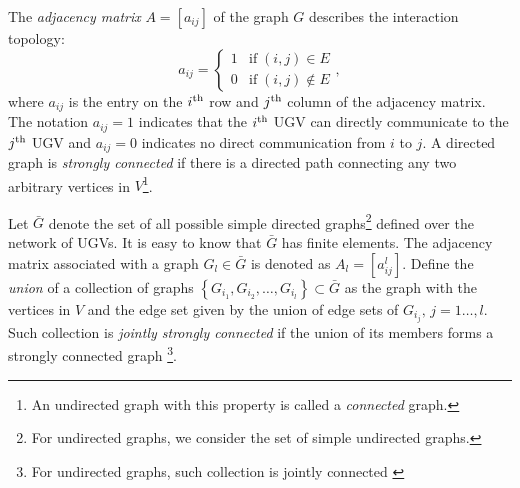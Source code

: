 	The \textit{adjacency matrix} $A=\left[ a_{ij}\right] $ of the graph $G$ describes the interaction topology:
	\small\begin{equation*}
		a_{ij}=\begin{cases}
			1& \text{if}\;\left(i,j\right)\in E\\
			0& \text{if}\;\left(i,j\right)\notin E
		\end{cases},
	\end{equation*} \normalsize
	where $a_{ij}$ is the entry on the $i^\text{th}$ row and $j^\text{th}$ column of the adjacency matrix. 
	The notation $a_{ij}=1$ indicates that the $i^\text{th}$ UGV can directly communicate to the $j^\text{th}$ UGV and $a_{ij}=0$ indicates no direct communication from $i$ to $j$.
	 A directed graph is \textit{strongly connected} if there is a directed path connecting any two arbitrary vertices in $V$\footnote{An undirected graph with this property is called a \textit{connected} graph.}.
	
	Let $\bar{G}$ denote the set of all possible simple directed graphs\footnote{For undirected graphs, we consider the set of simple undirected graphs.} defined over the network of UGVs.
	It is easy to know that $\bar{G}$ has finite elements.
	The adjacency matrix associated with a graph $G_l\in\bar{G}$ is denoted as $A_l=[a^l_{ij}]$.	
	Define the \textit{union} of a collection of graphs $\left\lbrace G_{i_1},G_{i_2},\dots,G_{i_l} \right\rbrace \subset \bar{G}$ as the graph with the vertices in $V$ and the edge set given by the union of edge sets of $G_{i_j},\,j=1\dots,l$.
	Such collection is \textit{jointly strongly connected} if the union of its members forms a strongly connected graph \footnote{For undirected graphs, such collection is {jointly connected} \cite{jadbabaie2003coordination}}.
	
